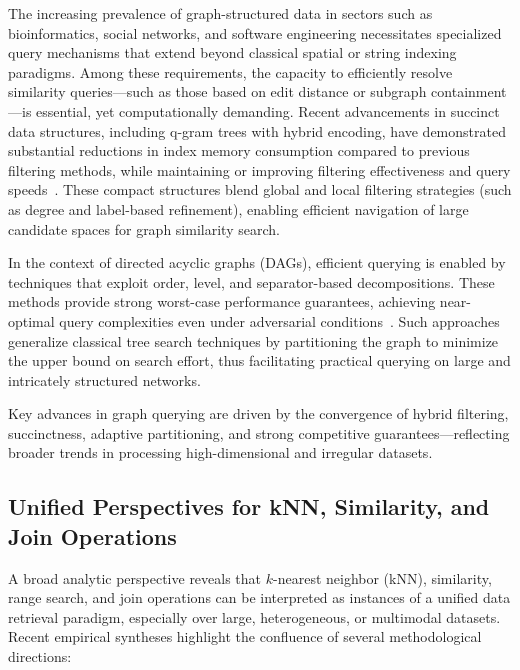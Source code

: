 \documentclass[sigconf]{acmart}
\begin{document}
The increasing prevalence of graph-structured data in sectors such as bioinformatics, social networks, and software engineering necessitates specialized query mechanisms that extend beyond classical spatial or string indexing paradigms. Among these requirements, the capacity to efficiently resolve similarity queries—such as those based on edit distance or subgraph containment—is essential, yet computationally demanding. Recent advancements in succinct data structures, including q-gram trees with hybrid encoding, have demonstrated substantial reductions in index memory consumption compared to previous filtering methods, while maintaining or improving filtering effectiveness and query speeds~\cite{ref106}. These compact structures blend global and local filtering strategies (such as degree and label-based refinement), enabling efficient navigation of large candidate spaces for graph similarity search.

In the context of directed acyclic graphs (DAGs), efficient querying is enabled by techniques that exploit order, level, and separator-based decompositions. These methods provide strong worst-case performance guarantees, achieving near-optimal query complexities even under adversarial conditions~\cite{ref107}. Such approaches generalize classical tree search techniques by partitioning the graph to minimize the upper bound on search effort, thus facilitating practical querying on large and intricately structured networks.

Key advances in graph querying are driven by the convergence of hybrid filtering, succinctness, adaptive partitioning, and strong competitive guarantees—reflecting broader trends in processing high-dimensional and irregular datasets.

\subsection{Unified Perspectives for kNN, Similarity, and Join Operations}

A broad analytic perspective reveals that $k$-nearest neighbor (kNN), similarity, range search, and join operations can be interpreted as instances of a unified data retrieval paradigm, especially over large, heterogeneous, or multimodal datasets. Recent empirical syntheses highlight the confluence of several methodological directions:
\end{document}
